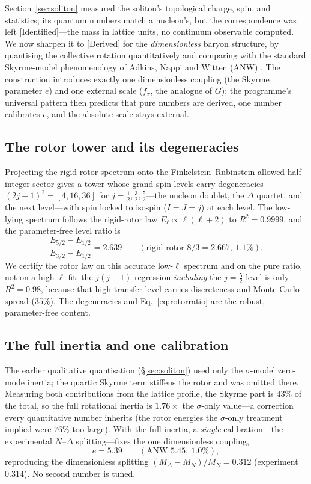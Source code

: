 \documentclass[aps,prd,reprint,nofootinbib,superscriptaddress,floatfix]{revtex4-2}
\theoremstyle{plain}
\newcommand{\Sderiv}{\textsf{[Derived]}}
\newcommand{\Sident}{\textsf{[Identified]}}
\begin{document}
Section~\ref{sec:soliton} measured the soliton's topological charge, spin, and
statistics; its quantum numbers match a nucleon's, but the correspondence was left
\Sident{}---the mass in lattice units, no continuum observable computed. We now
sharpen it to \Sderiv{} for the \emph{dimensionless} baryon structure, by quantising
the collective rotation quantitatively and comparing with the standard Skyrme-model
phenomenology of Adkins, Nappi and Witten (ANW) \cite{AdkinsNappiWitten1983,Witten1983}.
The construction introduces exactly one dimensionless coupling (the Skyrme parameter
$e$) and one external scale ($f_\pi$, the analogue of $G$); the programme's universal
pattern then predicts that pure numbers are derived, one number calibrates $e$, and the
absolute scale stays external.

\subsection{The rotor tower and its degeneracies}
Projecting the rigid-rotor spectrum onto the Finkelstein--Rubinstein-allowed
half-integer sector gives a tower whose grand-spin levels carry degeneracies
$(2j+1)^2=[4,16,36]$ for $j=\tfrac12,\tfrac32,\tfrac52$---the nucleon doublet, the
$\Delta$ quartet, and the next level---with spin locked to isospin ($I=J=j$) at each
level. The low-lying spectrum follows the rigid-rotor law $E_\ell\propto\ell(\ell+2)$
to $R^2=0.9999$, and the parameter-free level ratio is
\begin{equation}
\frac{E_{5/2}-E_{1/2}}{E_{3/2}-E_{1/2}}=2.639
\qquad(\text{rigid rotor }8/3=2.667,\ 1.1\%).
\label{eq:rotorratio}
\end{equation}
We certify the rotor law on this accurate low-$\ell$ spectrum and on the pure ratio,
not on a high-$\ell$ fit: the $j(j+1)$ regression \emph{including} the $j=\tfrac52$
level is only $R^2=0.98$, because that high transfer level carries discreteness and
Monte-Carlo spread ($35\%$). The degeneracies and Eq.~\eqref{eq:rotorratio} are the
robust, parameter-free content.

\subsection{The full inertia and one calibration}
The earlier qualitative quantisation (\S\ref{sec:soliton}) used only the
$\sigma$-model zero-mode inertia; the quartic Skyrme term stiffens the rotor and was
omitted there. Measuring both contributions from the lattice profile, the Skyrme part
is $43\%$ of the total, so the full rotational inertia is $1.76\times$ the
$\sigma$-only value---a correction every quantitative number inherits (the rotor
energies the $\sigma$-only treatment implied were $76\%$ too large). With the full
inertia, a \emph{single} calibration---the experimental $N$--$\Delta$ splitting---fixes
the one dimensionless coupling,
\begin{equation}
e=5.39\qquad(\text{ANW }5.45,\ 1.0\%),
\label{eq:ecalib}
\end{equation}
reproducing the dimensionless splitting $(M_\Delta-M_N)/M_N=0.312$ (experiment
$0.314$). No second number is tuned.
\end{document}
